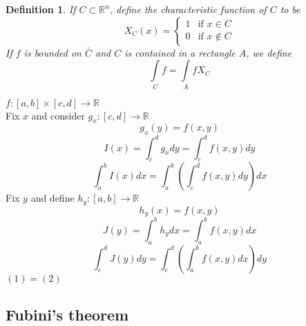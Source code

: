 \documentclass[11pt]{article}
\def\RR{\mathbb{R}}
\newtheorem{definition}{Definition}[section]
\begin{document}
\begin{definition}
If $C \subset \RR^n$, define the characteristic function of $C$ to be 
\[X_{C}(x) =\begin{cases}
  1 & \text{if } x \in C \\
   0      & \text{if } x \notin C
  \end{cases} \]
If $f$ is bounded on $\bar{C}$ and $C$ is contained in a rectangle $A$, we define 
\[\int\limits_{C}f = \int\limits_{A}fX_{C}\]
\end{definition}

\setcounter{equation}{0}
$f:[a,b]\times[c,d] \rightarrow \RR$\\
Fix $x$ and consider $g_{x}:[c,d]\rightarrow\RR$ 
\[g_{x}(y) = f(x,y)\]
\[I(x)=\int_{c}^{d}g_{x}dy = \int_c^df(x,y)dy\]
\begin{equation}
\int_a^bI(x)dx = \int_a^b\left(\int_c^df(x,y)dy\right)dx
\end{equation}
Fix $y$ and define $h_{y}:[a,b]\rightarrow\RR$
\[h_y(x)=f(x,y)\]
\[J(y)=\int_{a}^{b}h_{y}dx = \int_a^bf(x,y)dx\]
\begin{equation}
\int_c^dJ(y)dy = \int_c^d\left(\int_a^bf(x,y)dx\right)dy
\end{equation}
$(1) = (2)$

\subsection{Fubini's theorem}
\end{document}
